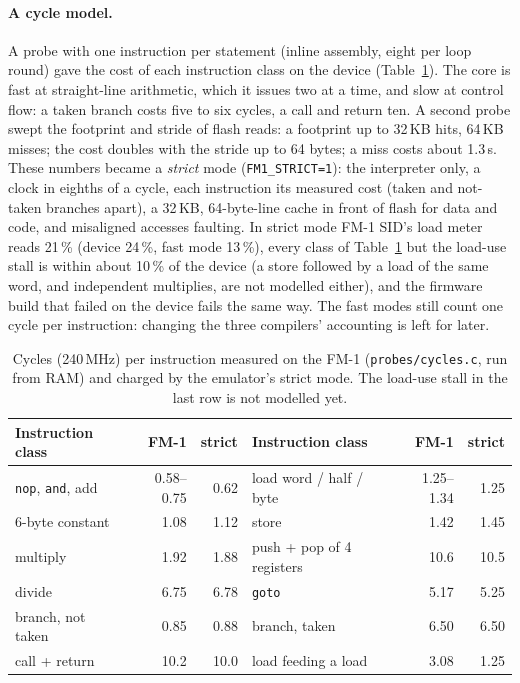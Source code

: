 \documentclass[10pt,a4paper]{article}
\newcommand{\code}[1]{\texttt{#1}}
\begin{document}
\paragraph{A cycle model.} A probe with one instruction per statement (inline assembly, eight per
loop round) gave the cost of each instruction class on the device (Table~\ref{tab:cyc}). The core is
fast at straight-line arithmetic, which it issues two at a time, and slow at control flow: a taken
branch costs five to six cycles, a call and return ten. A second probe swept the footprint and stride
of flash reads: a footprint up to 32\,KB hits, 64\,KB misses; the cost doubles with the stride up to
64 bytes; a miss costs about 1.3\,\textmu s. These numbers became a \emph{strict} mode
(\code{FM1\_STRICT=1}): the interpreter only, a clock in eighths of a cycle, each instruction its
measured cost (taken and not-taken branches apart), a 32\,KB, 64-byte-line cache in front of flash
for data and code, and misaligned accesses faulting. In strict mode FM-1 SID's load meter reads
21\,\% (device 24\,\%, fast mode 13\,\%), every class of Table~\ref{tab:cyc} but the load-use stall
is within about 10\,\% of the device (a store followed by a load of the same word, and independent
multiplies, are not modelled either), and the firmware build that failed on the device fails the
same way. The fast modes still count one cycle per instruction: changing the three
compilers' accounting is left for later.

\begin{table}[t]
\centering\footnotesize
\begin{tabular}{@{}lrrlrr@{}}
\toprule
Instruction class & FM-1 & strict & Instruction class & FM-1 & strict\\
\midrule
\code{nop}, \code{and}, add & 0.58--0.75 & 0.62 & load word / half / byte & 1.25--1.34 & 1.25\\
6-byte constant & 1.08 & 1.12 & store & 1.42 & 1.45\\
multiply & 1.92 & 1.88 & push + pop of 4 registers & 10.6 & 10.5\\
divide & 6.75 & 6.78 & \code{goto} & 5.17 & 5.25\\
branch, not taken & 0.85 & 0.88 & branch, taken & 6.50 & 6.50\\
call + return & 10.2 & 10.0 & load feeding a load & 3.08 & 1.25\\
\bottomrule
\end{tabular}
\caption{Cycles (240\,MHz) per instruction measured on the FM-1 (\code{probes/cycles.c}, run from
RAM) and charged by the emulator's strict mode. The load-use stall in the last row is not modelled
yet.}
\label{tab:cyc}
\end{table}
\end{document}
